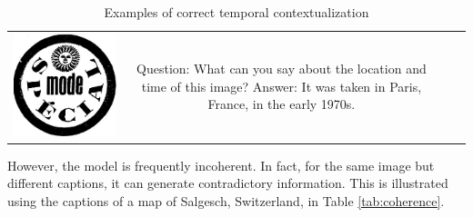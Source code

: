 \begin{table}[ht]
\begin{tabular}{c|c|c|c}
\begin{minipage}[c]{0.2\linewidth}
            \includegraphics[width=\linewidth]{Images/special.png}
        \end{minipage} &
        \begin{minipage}[c]{0.3\linewidth}
            Question: What can you say about the location and time of this image? Answer: It was taken in Paris, France, in the early 1970s.
        \end{minipage} \\
    \end{tabular}
    \caption{Examples of correct temporal contextualization}
    \label{tab:temporal-context}
\end{table}

However, the model is frequently incoherent. In fact, for the same image but different captions, it can generate contradictory information. This is illustrated using the captions of a map of Salgesch, Switzerland, in Table \ref{tab:coherence}.

